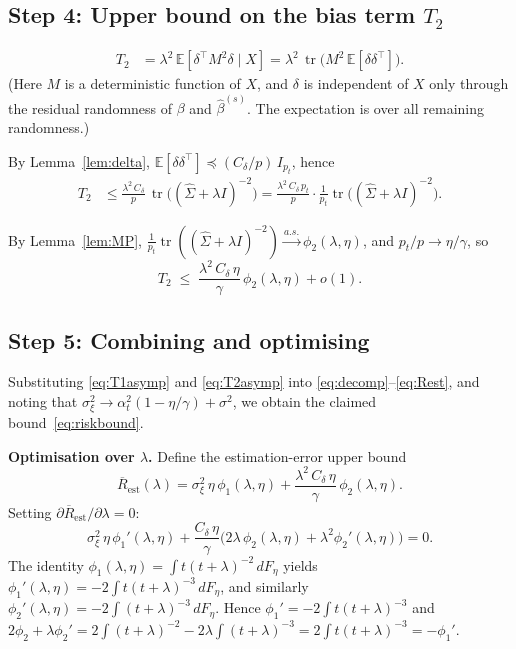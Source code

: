\documentclass[11pt,a4paper]{article}
\theoremstyle{definition}
\DeclareMathOperator{\tr}{tr}
\newcommand{\E}{\mathbb{E}}
\newcommand{\bhat}{\hat{\beta}^{(s)}}
\begin{document}
\subsection*{Step 4: Upper bound on the bias term $T_2$}

\begin{align}
  T_2
  &=\lambda^{2}\,\E[\delta^{\top}M^{2}\delta\mid X]
  =\lambda^{2}\,\tr\!\bigl(M^{2}\,\E[\delta\delta^{\top}]\bigr).
  \label{eq:T2trace}
\end{align}
(Here $M$ is a deterministic function of $X$, and $\delta$ is
independent of $X$ only through the residual randomness of $\beta$
and $\bhat$.  The expectation is over all remaining randomness.)

By Lemma~\ref{lem:delta},
$\E[\delta\delta^{\top}]\preceq(C_\delta/p)\,I_{p_t}$, hence
\begin{align}
  T_2
  &\le\frac{\lambda^{2}\,C_\delta}{p}\,
  \tr\!\bigl((\hat\Sigma+\lambda I)^{-2}\bigr)
  =\frac{\lambda^{2}\,C_\delta\,p_t}{p}\cdot
  \frac{1}{p_t}\tr\!\bigl((\hat\Sigma+\lambda I)^{-2}\bigr).
  \label{eq:T2bound}
\end{align}

By Lemma~\ref{lem:MP},
$\frac{1}{p_t}\tr((\hat\Sigma+\lambda I)^{-2})
\xrightarrow{a.s.}\phi_2(\lambda,\eta)$, and
$p_t/p\to\eta/\gamma$, so
\begin{equation}\label{eq:T2asymp}
  T_2\;\le\;
  \frac{\lambda^{2}\,C_\delta\,\eta}{\gamma}\,\phi_2(\lambda,\eta)
  +o(1).
\end{equation}

\subsection*{Step 5: Combining and optimising}

Substituting \eqref{eq:T1asymp} and \eqref{eq:T2asymp} into
\eqref{eq:decomp}--\eqref{eq:Rest}, and noting that
$\sigma_\xi^{2}\to\alpha_t^{2}(1-\eta/\gamma)+\sigma^{2}$, we obtain
the claimed bound~\eqref{eq:riskbound}.

\medskip
\noindent\textbf{Optimisation over $\lambda$.}\quad
Define the estimation-error upper bound
\[
  \overline{R}_{\mathrm{est}}(\lambda)
  =\sigma_\xi^{2}\,\eta\,\phi_1(\lambda,\eta)
  +\frac{\lambda^{2}\,C_\delta\,\eta}{\gamma}\,\phi_2(\lambda,\eta).
\]
Setting $\partial\overline{R}_{\mathrm{est}}/\partial\lambda=0$:
\begin{equation}\label{eq:FOC}
  \sigma_\xi^{2}\,\eta\,\phi_1'(\lambda,\eta)
  +\frac{C_\delta\,\eta}{\gamma}\bigl(
  2\lambda\,\phi_2(\lambda,\eta)+\lambda^{2}\phi_2'(\lambda,\eta)
  \bigr)=0.
\end{equation}
The identity
$\phi_1(\lambda,\eta)=\int t(t+\lambda)^{-2}\,dF_\eta$ yields
$\phi_1'(\lambda,\eta)=-2\int t(t+\lambda)^{-3}\,dF_\eta$, and similarly
$\phi_2'(\lambda,\eta)=-2\int(t+\lambda)^{-3}\,dF_\eta$.
Hence $\phi_1'=-2\int t(t+\lambda)^{-3}$ and
$2\phi_2+\lambda\phi_2'
=2\int(t+\lambda)^{-2}-2\lambda\int(t+\lambda)^{-3}
=2\int t(t+\lambda)^{-3}=-\phi_1'$.
\end{document}

